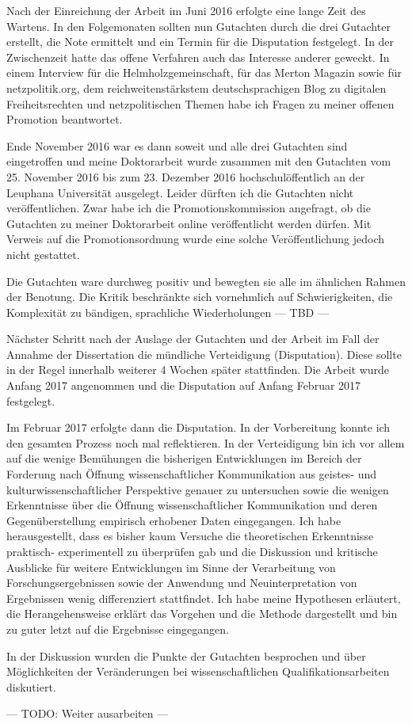 \begin{vorspann}
Nach der Einreichung der Arbeit im Juni 2016 erfolgte eine lange Zeit des Wartens. In den Folgemonaten sollten nun Gutachten durch die drei Gutachter erstellt, die Note ermittelt und ein Termin für die Disputation festgelegt. In der Zwischenzeit hatte das offene Verfahren auch das Interesse anderer geweckt. In einem Interview für die Helmholzgemeinschaft, für das Merton Magazin sowie für netzpolitik.org, dem reichweitenstärkstem deutschsprachigen Blog zu digitalen Freiheitsrechten und netzpolitischen Themen habe ich Fragen zu meiner offenen Promotion beantwortet.

Ende November 2016 war es dann soweit und alle drei Gutachten sind eingetroffen und meine Doktorarbeit wurde zusammen mit den Gutachten vom 25. November 2016 bis zum 23. Dezember 2016 hochschulöffentlich an der Leuphana Universität ausgelegt. Leider dürften ich die Gutachten nicht veröffentlichen. Zwar habe ich die Promotionskommission angefragt, ob die Gutachten zu meiner Doktorarbeit online veröffentlicht werden dürfen. Mit Verweis auf die Promotionsordnung wurde eine solche Veröffentlichung jedoch nicht gestattet.

Die Gutachten ware durchweg positiv und bewegten sie alle im ähnlichen Rahmen der Benotung. Die Kritik beschränkte sich vornehmlich auf Schwierigkeiten, die Komplexität zu bändigen, sprachliche Wiederholungen --- TBD ---

Nächster Schritt nach der Auslage der Gutachten und der Arbeit im Fall der Annahme der Dissertation die mündliche Verteidigung (Disputation). Diese sollte in der Regel innerhalb weiterer 4 Wochen später stattfinden. Die Arbeit wurde Anfang 2017 angenommen und die Disputation auf Anfang Februar 2017 festgelegt.

Im Februar 2017 erfolgte dann die Disputation. In der Vorbereitung konnte ich den gesamten Prozess noch mal reflektieren. In der Verteidigung bin ich vor allem auf die wenige Bemühungen die bisherigen Entwicklungen im Bereich der Forderung nach Öffnung wissenschaftlicher Kommunikation aus geistes- und kulturwissenschaftlicher Perspektive genauer zu untersuchen sowie die wenigen Erkenntnisse über die Öffnung wissenschaftlicher Kommunikation und deren Gegenüberstellung empirisch erhobener Daten eingegangen. Ich habe herausgestellt, dass es bisher kaum Versuche die theoretischen Erkenntnisse praktisch- experimentell zu überprüfen gab und die Diskussion und kritische Ausblicke für weitere Entwicklungen im Sinne der Verarbeitung von Forschungsergebnissen sowie der Anwendung und Neuinterpretation von Ergebnissen wenig differenziert stattfindet. Ich habe meine Hypothesen erläutert, die Herangehensweise erklärt das Vorgehen und die Methode dargestellt und bin zu guter letzt auf die Ergebnisse eingegangen.

In der Diskussion wurden die Punkte der Gutachten besprochen und über Möglichkeiten der Veränderungen bei wissenschaftlichen Qualifikationsarbeiten diskutiert.

--- TODO: Weiter ausarbeiten ---
\end{vorspann}
